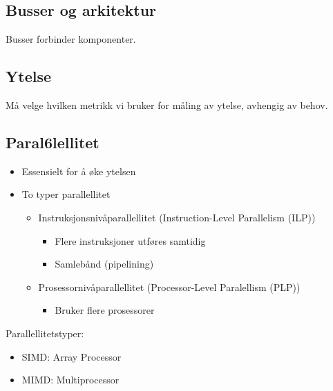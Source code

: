 \documentclass{article}
\begin{document}
			\subsection{Busser og arkitektur}
				Busser forbinder komponenter.
			\subsection{Ytelse}
				Må velge hvilken metrikk vi bruker for måling av ytelse, avhengig av behov.
			\subsection{Paral6lellitet}
				\begin{itemize}
					\item Essensielt for å øke ytelsen
					\item To typer parallellitet
						\begin{itemize}
							\item Instruksjonsnivåparallellitet (Instruction-Level Parallelism (ILP))
								\begin{itemize}
									\item Flere instruksjoner utføres samtidig
									\item Samlebånd (pipelining)
								\end{itemize}
							\item Prosessornivåparallellitet (Processor-Level Paralellism (PLP))
								\begin{itemize}
									\item Bruker flere prosessorer
								\end{itemize}
						\end{itemize}
				\end{itemize}
				Parallellitetstyper:
				\begin{itemize}
					\item SIMD: Array Processor
					\item MIMD: Multiprocessor
				\end{itemize}
		
\end{document}
